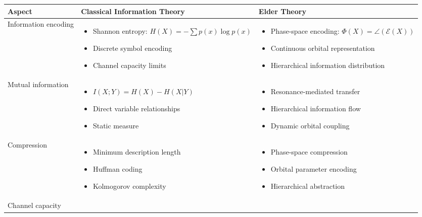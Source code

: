 \begin{center}
\begin{tabular}{|p{3cm}|p{5cm}|p{5cm}|}
\hline
\textbf{Aspect} & \textbf{Classical Information Theory} & \textbf{Elder Theory} \\
\hline
Information encoding & 
\begin{itemize}
    \item Shannon entropy: $H(X) = -\sum p(x)\log p(x)$
    \item Discrete symbol encoding
    \item Channel capacity limits
\end{itemize} &
\begin{itemize}
    \item Phase-space encoding: $\Phi(X) = \angle(\mathcal{E}(X))$
    \item Continuous orbital representation
    \item Hierarchical information distribution
\end{itemize} \\
\hline
Mutual information & 
\begin{itemize}
    \item $I(X;Y) = H(X) - H(X|Y)$
    \item Direct variable relationships
    \item Static measure
\end{itemize} &
\begin{itemize}
    \item Resonance-mediated transfer
    \item Hierarchical information flow
    \item Dynamic orbital coupling
\end{itemize} \\
\hline
Compression & 
\begin{itemize}
    \item Minimum description length
    \item Huffman coding
    \item Kolmogorov complexity
\end{itemize} &
\begin{itemize}
    \item Phase-space compression
    \item Orbital parameter encoding
    \item Hierarchical abstraction
\end{itemize} \\
\hline
Channel capacity & 
\begin{itemize}

\end{itemize}
\end{tabular}
\end{center}
